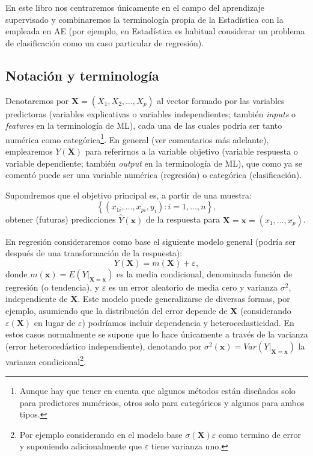\documentclass[
]{book}
\theoremstyle{break}
\theoremstyle{nonumberplain}
\begin{document}
En este libro nos centraremos únicamente en el campo del aprendizaje supervisado y combinaremos la terminología propia de la Estadística con la empleada en AE (por ejemplo, en Estadística es habitual considerar un problema de clasificación como un caso particular de regresión).

\hypertarget{notacion}{%
\subsection{Notación y terminología}\label{notacion}}

Denotaremos por \(\mathbf{X}=(X_1, X_2, \ldots, X_p)\) al vector formado por las variables predictoras (variables explicativas o variables independientes; también \emph{inputs} o \emph{features} en la terminología de ML), cada una de las cuales podría ser tanto numérica como categórica\footnote{Aunque hay que tener en cuenta que algunos métodos están diseñados solo para predictores numéricos, otros solo para categóricos y algunos para ambos tipos.}.
En general (ver comentarios más adelante), emplearemos \(Y\left(\mathbf{X} \right)\) para referirnos a la variable objetivo (variable respuesta o variable dependiente; también \emph{output} en la terminología de ML), que como ya se comentó puede ser una variable numérica (regresión) o categórica (clasificación).

Supondremos que el objetivo principal es, a partir de una muestra: \[\left\{ \left( x_{1i}, \ldots, x_{pi}, y_{i} \right)  : i = 1, \ldots, n \right\},\] obtener (futuras) predicciones \(\hat Y\left(\mathbf{x} \right)\) de la respuesta para \(\mathbf{X}=\mathbf{x}=\left(x_{1}, \ldots, x_{p}\right)\).

En regresión consideraremos como base el siguiente modelo general (podría ser después de una transformación de la respuesta):
\begin{equation} 
  Y(\mathbf{X})=m(\mathbf{X})+\varepsilon,
  \label{eq:modelogeneral}
\end{equation}
donde \(m(\mathbf{x}) = E\left( \left. Y\right\vert_{\mathbf{X}=\mathbf{x}} \right)\) es la media condicional, denominada función de regresión (o tendencia), y \(\varepsilon\) es un error aleatorio de media cero y varianza \(\sigma^2\), independiente de \(\mathbf{X}\).
Este modelo puede generalizarse de diversas formas, por ejemplo, asumiendo que la distribución del error depende de \(\mathbf{X}\) (considerando \(\varepsilon(\mathbf{X})\) en lugar de \(\varepsilon\)) podríamos incluir dependencia y heterocedasticidad.
En estos casos normalmente se supone que lo hace únicamente a través de la varianza (error heterocedástico independiente), denotando por \(\sigma^2(\mathbf{x}) = Var\left( \left. Y\right\vert_{\mathbf{X}=\mathbf{x}} \right)\) la varianza condicional\footnote{Por ejemplo considerando en el modelo base \(\sigma(\mathbf{X})\varepsilon\) como termino de error y suponiendo adicionalmente que \(\varepsilon\) tiene varianza uno.}.
\end{document}
